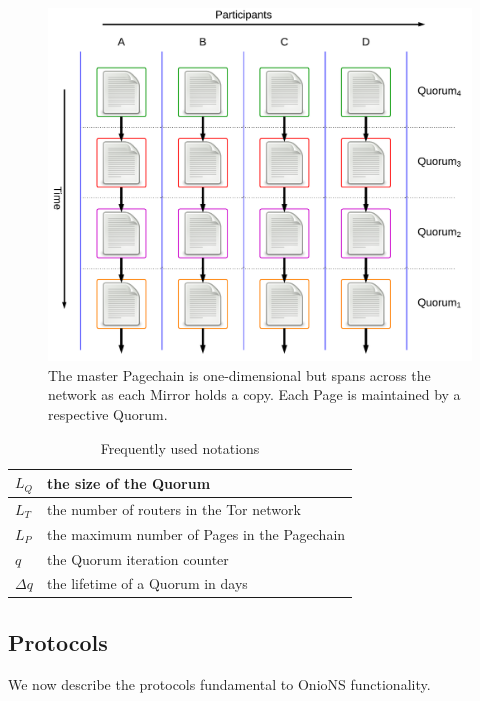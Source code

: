 \documentclass[conference]{IEEEtran}
\begin{document}
\begin{figure}[h!]
	\centering
	\includegraphics[width=0.9\linewidth]{../assets/images/LucidCharts/Data-Structure-Overview.pdf}
	\caption{The master Pagechain is one-dimensional but spans across the network as each Mirror holds a copy. Each Page is maintained by a respective Quorum.}
\end{figure}

\renewcommand{\arraystretch}{1.2}
\begin{table}[h]
	\small
	\begin{tabularx}{\linewidth}{ | l | X | }
		\hline
    	$ L_{Q} $ & the size of the Quorum \\ \hline
    	$ L_{T} $ & the number of routers in the Tor network \\ \hline
    	$ L_{P} $ & the maximum number of Pages in the Pagechain \\ \hline
    	$ q $ & the Quorum iteration counter \\ \hline
    	$ \Delta q $ & the lifetime of a Quorum in days \\ \hline
  	\end{tabularx}
  	\vspace{6pt}
  	\caption{Frequently used notations}
\end{table}

\subsection{Protocols}

We now describe the protocols fundamental to OnioNS functionality.
\end{document}

